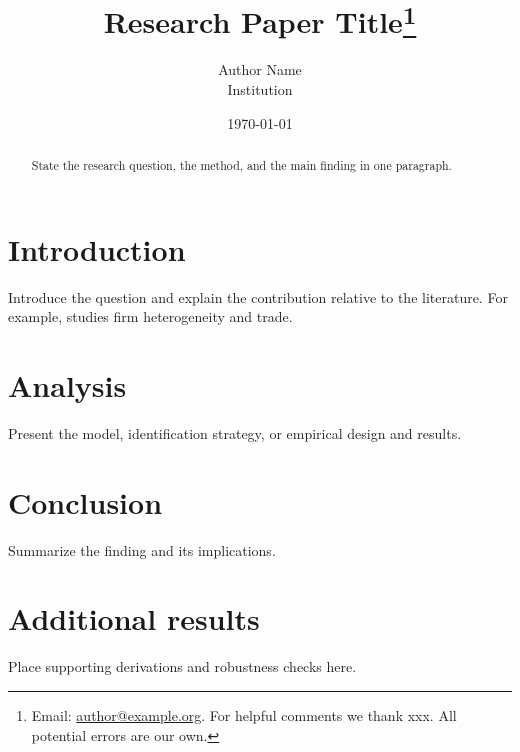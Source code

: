 \expandafter\documentclass\expandafter[\documentclassoptions]{article}
\title{Research Paper Title\thanks{%
  Email: \href{mailto:author@example.org}{author@example.org}.
  For helpful comments we thank xxx. All potential errors are our own.}}
\author{Author Name\\
  {\small\color{GitHubMuted}Institution}}
\date{\today}
\begin{document}
\maketitle

\begin{abstract}
State the research question, the method, and the main finding in one paragraph.
\end{abstract}

\section{Introduction}
Introduce the question and explain the contribution relative to the literature.
For example, \textcite{melitz_impact_2003} studies firm heterogeneity and trade.

\section{Analysis}
Present the model, identification strategy, or empirical design and results.

\section{Conclusion}
Summarize the finding and its implications.

\printbibliography[heading=bibintoc,title={References}]

\appendix
\section{Additional results}
Place supporting derivations and robustness checks here.
\end{document}
